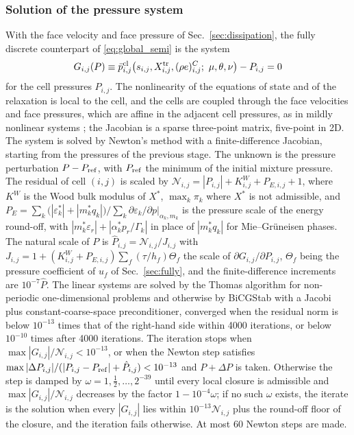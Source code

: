 \subsubsection{Solution of the pressure system}
\label{sec:pressure_system}
With the face velocity and face pressure of Sec.~\ref{sec:dissipation}, the fully discrete counterpart of
\eqref{eq:global_semi} is the system
\begin{equation}
G_{i,j}(P)\equiv\bar p^{\rm cl}_{i,j}\big(s_{i,j},X^{\rm tr}_{i,j},(\rho e)^C_{i,j};\ \mu,\theta,\nu\big)-P_{i,j}=0
\label{eq:global}
\end{equation}
for the cell pressures $P_{i,j}$. The nonlinearity of the equations of state and of the relaxation is local to the cell, and the cells are
coupled through the face velocities and face pressures, which are affine in the adjacent cell pressures, as in mildly
nonlinear systems \cite{DumbserCasulli2016,CasulliZanolli2012}; the Jacobian is a sparse three-point matrix, five-point in 2D.
The system is solved by Newton's method with a finite-difference Jacobian, starting from the pressures of the previous
stage. The unknown is the pressure perturbation $P-P_{\rm ref}$, with $P_{\rm ref}$ the
minimum of the initial mixture pressure. The residual of cell $(i,j)$ is scaled by $\mathcal N_{i,j}=|P_{i,j}|+K^W_{i,j}+P_{E,i,j}+1$, where
$K^W$ is the Wood bulk modulus of $X^*$, $\max_k\pi_k$ where $X^*$ is not admissible, and $P_{E}=\sum_k\big(|\varepsilon^*_k|+|m^*_kq_k|\big)/\sum_k\partial\varepsilon_k/\partial p|_{\alpha_k,m_k}$ is the
pressure scale of the energy round-off, with $|m^*_k\varepsilon_r|+|\alpha^*_kp_r/\Gamma_k|$ in place of $|m^*_kq_k|$ for Mie--Gr\"uneisen phases. The natural scale of $P$ is $\hat P_{i,j}=\mathcal N_{i,j}/J_{i,j}$ with
$J_{i,j}=1+(K^W_{i,j}+P_{E,i,j})\sum_f(\tau/h_f)\Theta_f$ the scale of $\partial G_{i,j}/\partial P_{i,j}$, $\Theta_f$ being the pressure coefficient of $u_f$ of Sec.~\ref{sec:fully},
and the finite-difference increments are $10^{-7}\hat P$. The linear systems are solved by the Thomas algorithm for
non-periodic one-dimensional problems and otherwise by BiCGStab with a Jacobi plus constant-coarse-space
preconditioner, converged when the residual norm is below $10^{-13}$ times that of the right-hand side within 4000 iterations, or below $10^{-10}$ times after 4000 iterations. The
iteration stops when $\max|G_{i,j}|/\mathcal N_{i,j}<10^{-13}$, or when the Newton step satisfies $\max|\Delta P_{i,j}|/(|P_{i,j}-P_{\rm ref}|+\hat P_{i,j})<10^{-13}$
and $P+\Delta P$ is taken. Otherwise the step is damped by $\omega=1,\tfrac12,\dots,2^{-39}$ until every local closure is
admissible and $\max|G_{i,j}|/\mathcal N_{i,j}$ decreases by the factor $1-10^{-4}\omega$; if no such $\omega$ exists, the iterate is the solution when every $|G_{i,j}|$ lies within $10^{-13}\mathcal N_{i,j}$ plus the
round-off floor of the closure, and the iteration fails otherwise. At most 60 Newton steps are made.

